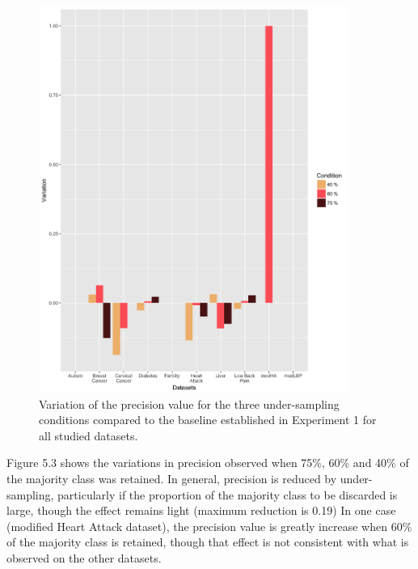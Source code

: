 \begin{figure}[!htbp]
    \centering
    \includegraphics[width=0.9\textwidth]{ThesisTemplate/usingLatex/chapter5Images/PreciVariationUnderBySets.png}
    \caption{Variation of the precision value for the three under-sampling conditions compared to the baseline established in Experiment 1 for all studied datasets.}
    \label{fig:my_label}
\end{figure}

Figure 5.3 shows the variations in precision observed when 75\%, 60\% and 40\% of the majority class was retained. In general, precision is reduced by under-sampling, particularly if the proportion of the majority class to be discarded is large, though the effect remains light (maximum reduction is 0.19) In one case (modified Heart Attack dataset), the precision value is greatly increase when 60\% of the majority class is retained, though that effect is not consistent with what is observed on the other datasets.\newline

